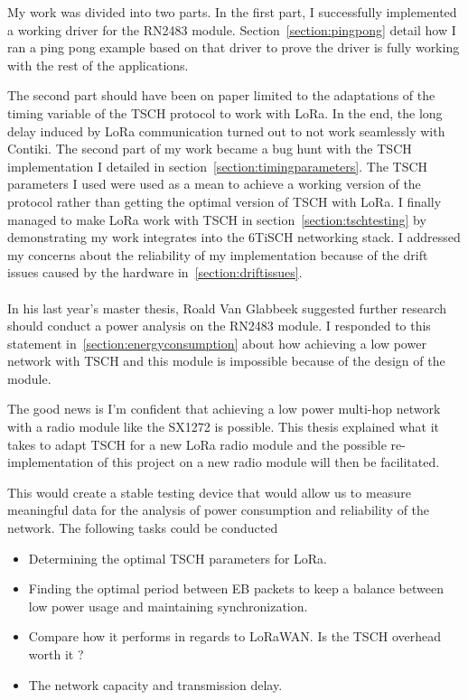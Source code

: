 \documentclass[11pt]{report}
\begin{document}
My work was divided into two parts. 
In the first part, I successfully implemented a working driver for the RN2483
module. 
Section~\ref{section:pingpong} detail how I ran a ping pong
example based on that driver to prove the driver is fully working with the
rest of the applications.

The second part should have been on paper limited to the adaptations of the
timing variable of the TSCH protocol to work with LoRa.
In the end, the long delay induced by LoRa communication turned out to 
not work seamlessly with Contiki. 
The second part of my work became a bug hunt with the TSCH implementation 
I detailed in section~\ref{section:timingparameters}.
The TSCH parameters I used were used as a mean to achieve a working version of
the protocol rather than getting the optimal version of TSCH with LoRa.
I finally managed to make LoRa work with TSCH in section~\ref{section:tschtesting} by
demonstrating my work integrates into the 6TiSCH networking stack.
I addressed my concerns about the reliability of my implementation
because of the drift issues caused by the hardware in~\ref{section:driftissues}.

\paragraph{}

In his last year's master thesis, Roald Van Glabbeek suggested further research
should conduct a power analysis on the RN2483 module.
I responded to this statement in~\ref{section:energyconsumption} about how
achieving a low power network with TSCH and this module is impossible because
of the design of the module.

The good news is I'm confident that achieving a low power multi-hop network with 
a radio module like the SX1272 is possible.
This thesis explained what it takes to adapt TSCH for a new LoRa radio
module and the possible re-implementation of this project on a new radio module 
will then be facilitated. 

This would create a stable testing device that would allow us to measure meaningful 
data for the analysis of power consumption and reliability of the network.
The following tasks could be conducted

\begin{itemize}
  \item Determining the optimal TSCH parameters for LoRa. 
  \item Finding the optimal period between EB packets to keep a balance between
    low power usage and maintaining synchronization.
  \item Compare how it performs in regards to LoRaWAN. Is the TSCH overhead
    worth it ?
  \item The network capacity and transmission delay.
\end{itemize}
\end{document}
